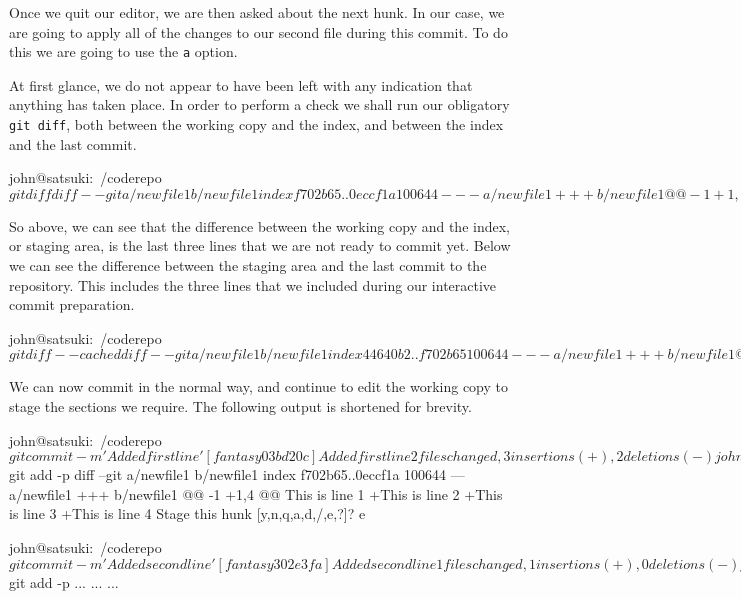 Once we quit our editor, we are then asked about the next hunk.
In our case, we are going to apply all of the changes to our second file during this commit.
To do this we are going to use the \texttt{a} option.


At first glance, we do not appear to have been left with any indication that anything has taken place.
In order to perform a check we shall run our obligatory \texttt{git diff}, both between the working copy and the index, and between the index and the last commit.

\begin{code}
john@satsuki:~/coderepo$ git diff
diff --git a/newfile1 b/newfile1
index f702b65..0eccf1a 100644
--- a/newfile1
+++ b/newfile1
@@ -1 +1,4 @@
 This is line 1
+This is line 2
+This is line 3
+This is line 4
john@satsuki:~/coderepo$
\end{code}

So above, we can see that the difference between the working copy and the index, or staging area, is the last three lines that we are not ready to commit yet.
Below we can see the difference between the staging area and the last commit to the repository.
This includes the three lines that we included during our interactive commit preparation.

\begin{code}
john@satsuki:~/coderepo$ git diff --cached
diff --git a/newfile1 b/newfile1
index 44640b2..f702b65 100644
--- a/newfile1
+++ b/newfile1
@@ -1,2 +1 @@
-A new file
-and some more awesome changes
+This is line 1
diff --git a/newfile2 b/newfile2
index 3545c1d..40efcce 100644
--- a/newfile2
+++ b/newfile2
@@ -1,2 +1,4 @@
 Another new file
 and a new awesome feature
+This is a new line
+This is another new line
john@satsuki:~/coderepo$
\end{code}

We can now commit in the normal way, and continue to edit the working copy to stage the sections we require.
The following output is shortened for brevity.

\begin{code}
john@satsuki:~/coderepo$ git commit -m 'Added first line'
[fantasy 03bd20c] Added first line
 2 files changed, 3 insertions(+), 2 deletions(-)
john@satsuki:~/coderepo$ git add -p
diff --git a/newfile1 b/newfile1
index f702b65..0eccf1a 100644
--- a/newfile1
+++ b/newfile1
@@ -1 +1,4 @@
 This is line 1
+This is line 2
+This is line 3
+This is line 4
Stage this hunk [y,n,q,a,d,/,e,?]? e

john@satsuki:~/coderepo$ git commit -m 'Added second line'
[fantasy 302e3fa] Added second line
 1 files changed, 1 insertions(+), 0 deletions(-)
john@satsuki:~/coderepo$ git add -p
...
...
...
\end{code}

